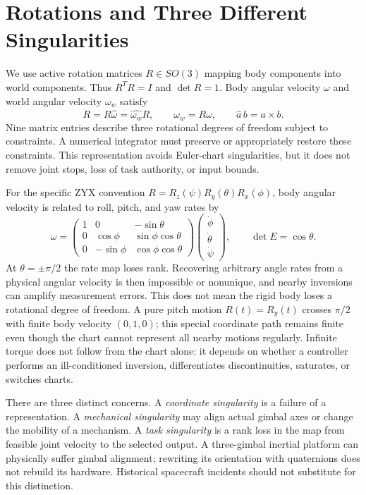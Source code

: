 \documentclass[12pt, openany]{book}
\theoremstyle{plain}
\begin{document}
\section{Rotations and Three Different Singularities}

We use active rotation matrices $R\in SO(3)$ mapping body components into
world components. Thus $R^TR=I$ and $\det R=1$. Body angular velocity $\omega$
and world angular velocity $\omega_w$ satisfy
\begin{equation}\label{eq:manifold_rotation_kinematics}
 \dot R=R\widehat\omega=\widehat{\omega_w}R,\qquad
 \omega_w=R\omega,\qquad \widehat a\,b=a\times b.
\end{equation}
Nine matrix entries describe three rotational degrees of freedom subject to
constraints. A numerical integrator must preserve or appropriately restore
these constraints. This representation avoids Euler-chart singularities,
but it does not remove joint stops, loss of task authority, or input bounds.

For the specific ZYX convention $R=R_z(\psi)R_y(\theta)R_x(\phi)$, body
angular velocity is related to roll, pitch, and yaw rates by
\begin{equation}\label{eq:manifold_euler_rates}
 \omega=
 \begin{pmatrix}
 1&0&-\sin\theta\\
 0&\cos\phi&\sin\phi\cos\theta\\
 0&-\sin\phi&\cos\phi\cos\theta
 \end{pmatrix}
 \begin{pmatrix}\dot\phi\\\dot\theta\\\dot\psi\end{pmatrix},
 \qquad \det E=\cos\theta.
\end{equation}
At $\theta=\pm\pi/2$ the rate map loses rank. Recovering arbitrary angle
rates from a physical angular velocity is then impossible or nonunique, and
nearby inversions can amplify measurement errors. This does not mean the
rigid body loses a rotational degree of freedom. A pure pitch motion
$R(t)=R_y(t)$ crosses $\pi/2$ with finite body velocity $(0,1,0)$; this special
coordinate path remains finite even though the chart cannot represent all
nearby motions regularly. Infinite torque does not follow from the chart
alone: it depends on whether a controller performs an ill-conditioned
inversion, differentiates discontinuities, saturates, or switches charts.

There are three distinct concerns. A \emph{coordinate singularity} is a
failure of a representation. A \emph{mechanical singularity} may align actual
gimbal axes or change the mobility of a mechanism. A \emph{task singularity}
is a rank loss in the map from feasible joint velocity to the selected output.
A three-gimbal inertial platform can physically suffer gimbal alignment;
rewriting its orientation with quaternions does not rebuild its hardware.
Historical spacecraft incidents should not substitute for this distinction.
\end{document}
